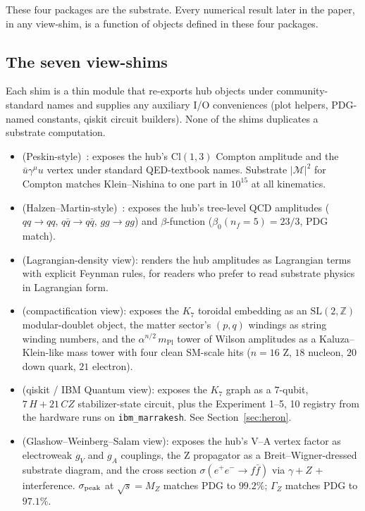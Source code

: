 \documentclass[11pt]{article}
\newcommand{\mPl}{m_{\mathrm{Pl}}}
\newcommand{\Z}{\mathbb{Z}}
\begin{document}
These four packages are the substrate.  Every numerical result
later in the paper, in any view-shim, is a function of objects
defined in these four packages.

\subsection{The seven view-shims}

Each shim is a thin module that re-exports hub objects under
community-standard names and supplies any auxiliary I/O conveniences
(plot helpers, PDG-named constants, qiskit circuit builders).
None of the shims duplicates a substrate computation.

\begin{itemize}
\item[\texttt{qed}] (Peskin-style)~\cite{peskin1995}: exposes the
  hub's $\mathrm{Cl}(1,3)$ Compton amplitude and the
  $\bar u \gamma^\mu u$ vertex under standard QED-textbook names.
  Substrate $|\mathcal{M}|^2$ for Compton matches Klein--Nishina to
  one part in $10^{15}$ at all kinematics.

\item[\texttt{qcd}] (Halzen--Martin-style)~\cite{halzen1984}:
  exposes the hub's tree-level QCD amplitudes ($qq \to qq$,
  $q\bar q \to q\bar q$, $gg \to gg$) and $\beta$-function
  ($\beta_0(n_f=5) = 23/3$, PDG match).

\item[\texttt{qft}] (Lagrangian-density view): renders the hub
  amplitudes as Lagrangian terms with explicit Feynman rules,
  for readers who prefer to read substrate physics in
  Lagrangian form.

\item[\texttt{string}] (compactification view): exposes the
  $K_7$ toroidal embedding as an $\mathrm{SL}(2,\Z)$
  modular-doublet object, the matter sector's $(p,q)$ windings as
  string winding numbers, and the $\alpha^{n/2}\,\mPl$ tower of
  Wilson amplitudes as a Kaluza--Klein-like mass tower with four
  clean SM-scale hits ($n = 16$ Z, $18$ nucleon, $20$ down quark,
  $21$ electron).

\item[\texttt{heron}] (qiskit / IBM Quantum view): exposes the
  $K_7$ graph as a $7$-qubit, $7\,H + 21\,CZ$ stabilizer-state
  circuit, plus the Experiment 1--5, 10 registry from the
  hardware runs on \texttt{ibm\_marrakesh}.  See
  Section~\ref{sec:heron}.

\item[\texttt{electroweak}] (Glashow--Weinberg--Salam view): exposes
  the hub's V--A vertex factor as electroweak $g_V$ and $g_A$
  couplings, the Z propagator as a Breit--Wigner-dressed
  substrate diagram, and the cross section
  $\sigma(e^+e^- \to f\bar f)$ via $\gamma + Z$ + interference.
  $\sigma_{\rm peak}$ at $\sqrt{s} = M_Z$ matches PDG to $99.2\%$;
  $\Gamma_Z$ matches PDG to $97.1\%$.


\end{itemize}
\end{document}
